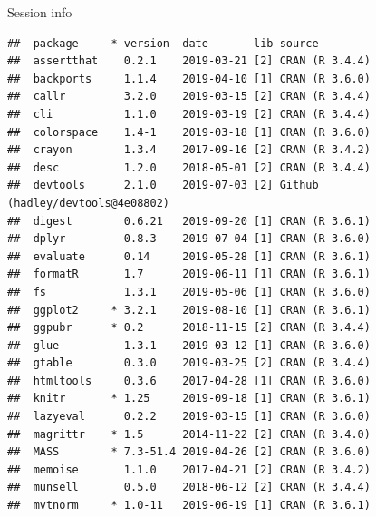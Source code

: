 \documentclass[ignorenonframetext,]{beamer}
\newenvironment{Shaded}{\begin{snugshade}}{\end{snugshade}}
\newcommand{\KeywordTok}[1]{\textcolor[rgb]{0.13,0.29,0.53}{\textbf{#1}}}
\newcommand{\OperatorTok}[1]{\textcolor[rgb]{0.81,0.36,0.00}{\textbf{#1}}}
\newcommand{\NormalTok}[1]{#1}
\begin{document}
\begin{frame}[fragile]{Session info}

\tiny

\begin{Shaded}
\end{Shaded}

\begin{verbatim}
##  package     * version  date       lib source                            
##  assertthat    0.2.1    2019-03-21 [2] CRAN (R 3.4.4)                    
##  backports     1.1.4    2019-04-10 [1] CRAN (R 3.6.0)                    
##  callr         3.2.0    2019-03-15 [2] CRAN (R 3.4.4)                    
##  cli           1.1.0    2019-03-19 [2] CRAN (R 3.4.4)                    
##  colorspace    1.4-1    2019-03-18 [1] CRAN (R 3.6.0)                    
##  crayon        1.3.4    2017-09-16 [2] CRAN (R 3.4.2)                    
##  desc          1.2.0    2018-05-01 [2] CRAN (R 3.4.4)                    
##  devtools      2.1.0    2019-07-03 [2] Github (hadley/devtools@4e08802)  
##  digest        0.6.21   2019-09-20 [1] CRAN (R 3.6.1)                    
##  dplyr         0.8.3    2019-07-04 [1] CRAN (R 3.6.0)                    
##  evaluate      0.14     2019-05-28 [1] CRAN (R 3.6.1)                    
##  formatR       1.7      2019-06-11 [1] CRAN (R 3.6.1)                    
##  fs            1.3.1    2019-05-06 [1] CRAN (R 3.6.0)                    
##  ggplot2     * 3.2.1    2019-08-10 [1] CRAN (R 3.6.1)                    
##  ggpubr      * 0.2      2018-11-15 [2] CRAN (R 3.4.4)                    
##  glue          1.3.1    2019-03-12 [1] CRAN (R 3.6.0)                    
##  gtable        0.3.0    2019-03-25 [2] CRAN (R 3.4.4)                    
##  htmltools     0.3.6    2017-04-28 [1] CRAN (R 3.6.0)                    
##  knitr       * 1.25     2019-09-18 [1] CRAN (R 3.6.1)                    
##  lazyeval      0.2.2    2019-03-15 [1] CRAN (R 3.6.0)                    
##  magrittr    * 1.5      2014-11-22 [2] CRAN (R 3.4.0)                    
##  MASS        * 7.3-51.4 2019-04-26 [2] CRAN (R 3.6.0)                    
##  memoise       1.1.0    2017-04-21 [2] CRAN (R 3.4.2)                    
##  munsell       0.5.0    2018-06-12 [2] CRAN (R 3.4.4)                    
##  mvtnorm     * 1.0-11   2019-06-19 [1] CRAN (R 3.6.1)                    

\end{verbatim}
\end{frame}
\end{document}
